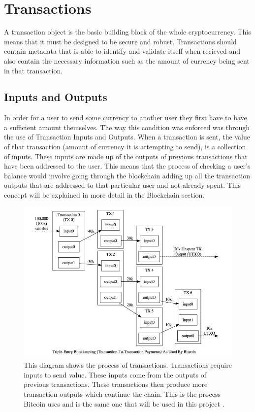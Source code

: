 \documentclass{l4proj}
\begin{document}

\section{Transactions}
A transaction object is the basic building block of the whole cryptocurrency. This means that it must be designed 
to be secure and robust. Transactions should contain metadata that is able to identify and validate itself when
recieved and also contain the necessary information such as the amount of currency being sent in that transaction.

\subsection{Inputs and Outputs}
In order for a user to send some currency to another user they first have to have a sufficient amount themselves. The
way this condition was enforced was through the use of Transaction Inputs and Outputs. When a transaction is
sent, the value of that transaction (amount of currency it is attempting to send), is a collection of inputs. These inputs
are made up of the outputs of previous transactions that have been addressed to the user. This means that the process of
checking a user's balance would involve going through the blockchain adding up all the transaction outputs that
are addressed to that particular user and not already spent. This concept will be explained in more detail in the Blockchain section.

\begin{figure}[!ht]
    \centering
    \includegraphics[width=1\linewidth]{images/utxo-model.jpg}    

    \caption{
        This diagram shows the process of transactions. Transactions require inputs to send value. These inputs come from
        the outputs of previous transactions. These transactions then produce more transaction outputs which continue
        the chain. This is the process Bitcoin uses and is the same one that will be used in this project \citep{bitcoinimage}. 
    }
    \label{fig:transaction} 
\end{figure}
\end{document}
